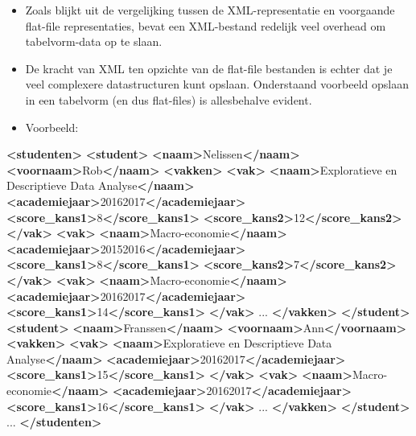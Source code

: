 \documentclass[]{memoir}
\newenvironment{Shaded}{\begin{snugshade}}{\end{snugshade}}
\newcommand{\KeywordTok}[1]{\textcolor[rgb]{0.13,0.29,0.53}{\textbf{#1}}}
\newcommand{\NormalTok}[1]{#1}
\providecommand{\tightlist}{%
  \setlength{\itemsep}{0pt}\setlength{\parskip}{0pt}}
\begin{document}
\begin{itemize}
\tightlist
\item
  Zoals blijkt uit de vergelijking tussen de XML-representatie en voorgaande flat-file representaties, bevat een XML-bestand redelijk veel overhead om tabelvorm-data op te slaan.
\item
  De kracht van XML ten opzichte van de flat-file bestanden is echter dat je veel complexere datastructuren kunt opslaan. Onderstaand voorbeeld opslaan in een tabelvorm (en dus flat-files) is allesbehalve evident.
\item
  Voorbeeld:
\end{itemize}

\begin{Shaded}
\begin{Highlighting}[]
\KeywordTok{<studenten>}
  \KeywordTok{<student>}
    \KeywordTok{<naam>}\NormalTok{Nelissen}\KeywordTok{</naam>}
    \KeywordTok{<voornaam>}\NormalTok{Rob}\KeywordTok{</naam>}
    \KeywordTok{<vakken>}
      \KeywordTok{<vak>}
        \KeywordTok{<naam>}\NormalTok{Exploratieve en Descriptieve Data Analyse}\KeywordTok{</naam>}
        \KeywordTok{<academiejaar>}\NormalTok{20162017}\KeywordTok{</academiejaar>}
        \KeywordTok{<score_kans1>}\NormalTok{8}\KeywordTok{</score_kans1>}
        \KeywordTok{<score_kans2>}\NormalTok{12}\KeywordTok{</score_kans2>}
      \KeywordTok{</vak>}
      \KeywordTok{<vak>}
        \KeywordTok{<naam>}\NormalTok{Macro-economie}\KeywordTok{</naam>}
        \KeywordTok{<academiejaar>}\NormalTok{20152016}\KeywordTok{</academiejaar>}
        \KeywordTok{<score_kans1>}\NormalTok{8}\KeywordTok{</score_kans1>}
        \KeywordTok{<score_kans2>}\NormalTok{7}\KeywordTok{</score_kans2>}
      \KeywordTok{</vak>}
      \KeywordTok{<vak>}
        \KeywordTok{<naam>}\NormalTok{Macro-economie}\KeywordTok{</naam>}
        \KeywordTok{<academiejaar>}\NormalTok{20162017}\KeywordTok{</academiejaar>}
        \KeywordTok{<score_kans1>}\NormalTok{14}\KeywordTok{</score_kans1>}
      \KeywordTok{</vak>}
\NormalTok{      ...}
    \KeywordTok{</vakken>}
  \KeywordTok{</student>}
  \KeywordTok{<student>}
    \KeywordTok{<naam>}\NormalTok{Franssen}\KeywordTok{</naam>}
    \KeywordTok{<voornaam>}\NormalTok{Ann}\KeywordTok{</voornaam>}
    \KeywordTok{<vakken>}
      \KeywordTok{<vak>}
        \KeywordTok{<naam>}\NormalTok{Exploratieve en Descriptieve Data Analyse}\KeywordTok{</naam>}
        \KeywordTok{<academiejaar>}\NormalTok{20162017}\KeywordTok{</academiejaar>}
        \KeywordTok{<score_kans1>}\NormalTok{15}\KeywordTok{</score_kans1>}
      \KeywordTok{</vak>}
      \KeywordTok{<vak>}
        \KeywordTok{<naam>}\NormalTok{Macro-economie}\KeywordTok{</naam>}
        \KeywordTok{<academiejaar>}\NormalTok{20162017}\KeywordTok{</academiejaar>}
        \KeywordTok{<score_kans1>}\NormalTok{16}\KeywordTok{</score_kans1>}
      \KeywordTok{</vak>}
\NormalTok{      ...}
    \KeywordTok{</vakken>}
  \KeywordTok{</student>}
\NormalTok{  ...}
\KeywordTok{</studenten>}
\end{Highlighting}
\end{Shaded}
\end{document}

